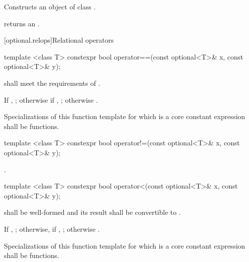 \begin{itemdescr}
\pnum
\effects
Constructs an object of class .

\pnum
\postcondition
{} returns an
\ntbs.
\end{itemdescr}

[optional.relops]{Relational operators}

%
\begin{itemdecl}
template <class T> constexpr bool operator==(const optional<T>& x, const optional<T>& y);
\end{itemdecl}

\begin{itemdescr}
\pnum
\requires
{} shall meet the requirements of .

\pnum
\returns
If , ; otherwise if , ; otherwise .

\pnum
\remarks
Specializations of this function template
for which  is a core constant expression
shall be  functions.
\end{itemdescr}

%
\begin{itemdecl}
template <class T> constexpr bool operator!=(const optional<T>& x, const optional<T>& y);
\end{itemdecl}

\begin{itemdescr}
\pnum
\returns
{}.
\end{itemdescr}

%
\begin{itemdecl}
template <class T> constexpr bool operator<(const optional<T>& x, const optional<T>& y);
\end{itemdecl}

\begin{itemdescr}
\pnum
\requires
{} shall be well-formed
and its result shall be convertible to .

\pnum
\returns
If , ;
otherwise, if , ;
otherwise .

\pnum
\remarks
Specializations of this function template
for which  is a core constant expression
shall be  functions.
\end{itemdescr}

